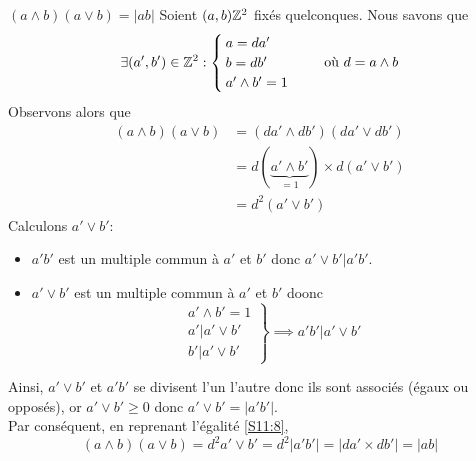 \documentclass{article}
\begin{document}
\begin{question_kholle}{$(a\land b)(a\lor b) = |ab|$}
  Soient $(a,b)\if\Z^{2}$ fixés quelconques. Nous savons que
  \[
    \exists (a', b')\in\mathbb Z^{2}:
    \begin{cases}
      a=da' \\
      b=db' \\
      a'\land b'=1
    \end{cases} \quad \text{ où } d=a\land b
  \]
  Observons alors que
  \begin{align}
    (a\land b)(a\lor b) & =(da'\land db')(da'\lor db')
    \nonumber
    \\
                        & = d(\underbrace{a'\land b'}_{=1})\times d(a'\lor b') \nonumber \\
                        & = d^{2}(a'\lor b') \label{S11:8}\tag{$\star$}
  \end{align}
  Calculons $a'\lor b'$:
  \begin{itemize}
    \item $a' b'$ est un multiple commun à $a'$ et $b'$ donc $a'\lor b'
            \vert a' b'$.
    \item $a'\lor b'$ est un multiple commun à $a'$ et $b'$ doonc
          \[
            \left.
            \begin{array}{l}
              a'\land b'=1       \\
              a' \vert a'\lor b' \\
              b' \vert a'\lor b'
            \end{array}\right\} \implies  a' b' \vert a'\lor b'
          \]
  \end{itemize}
  Ainsi, $a'\lor b'$ et $a' b'$ se divisent l’un l’autre donc ils sont
  associés (égaux ou opposés), or $a'\lor b'\geq 0$ donc $a'\lor b'=|a' b'|$.\\
  Par conséquent, en reprenant l’égalité \eqref{S11:8},
  \[
    (a\land b)(a\lor b) = d^{2}a' \lor b' = d^{2} |a' b'| = |da' \times
    db'| = |ab|
  \]

\end{question_kholle}
\end{document}
